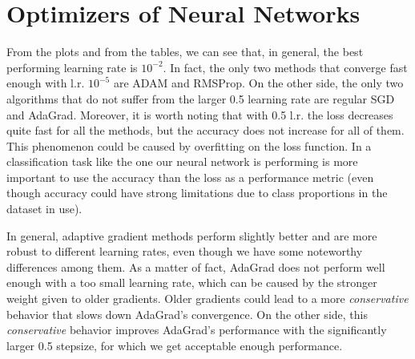 \documentclass[12pt]{article}
\begin{document}
\section{Optimizers of Neural Networks}

From the plots and from the tables, we can see that, in general, the best performing learning rate is $10^{-2}$. In fact, the only two methods that converge fast enough with l.r. $10^{-5}$ are ADAM and RMSProp. On the other side, the only two algorithms that do not suffer from the larger 0.5 learning rate are regular SGD and AdaGrad. Moreover, it is worth noting that with 0.5 l.r. the loss decreases quite fast for all the methods, but the accuracy does not increase for all of them. This phenomenon could be caused by overfitting on the loss function. In a classification task like the one our neural network is performing is more important to use the accuracy than the loss as a performance metric (even though accuracy could have strong limitations due to class proportions in the dataset in use).

In general, adaptive gradient methods perform slightly better and are more robust to different learning rates, even though we have some noteworthy differences among them. As a matter of fact, AdaGrad does not perform well enough with a too small learning rate, which can be caused by the stronger weight given to older gradients. Older gradients could lead to a more \textit{conservative} behavior that slows down AdaGrad's convergence. On the other side, this \textit{conservative} behavior improves AdaGrad's performance with the significantly larger 0.5 stepsize, for which we get acceptable enough performance.
\end{document}
